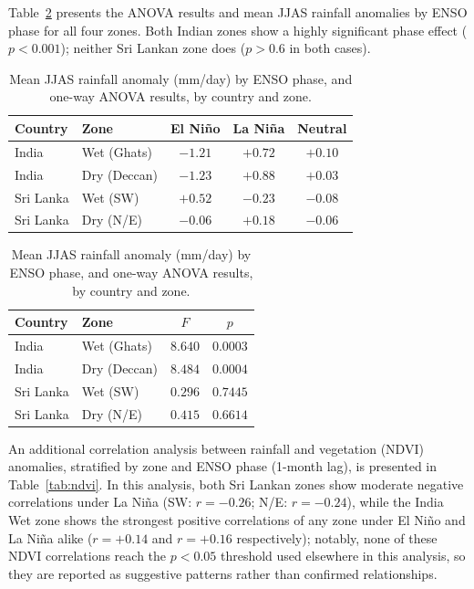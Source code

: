 \documentclass{article}
\begin{document}
Table~\ref{tab:anova} presents the ANOVA results and mean JJAS rainfall anomalies by
ENSO phase for all four zones. Both Indian zones show a highly significant phase effect
($p<0.001$); neither Sri Lankan zone does ($p>0.6$ in both cases).

\begin{table}[h]
\centering
\caption{Mean JJAS rainfall anomaly (mm/day) by ENSO phase, and one-way ANOVA results,
by country and zone.}
\label{tab:anova}
\begin{tabular}{llccc}
\toprule
Country & Zone & El Ni\~{n}o & La Ni\~{n}a & Neutral \\
\midrule
India & Wet (Ghats) & $-1.21$ & $+0.72$ & $+0.10$ \\
India & Dry (Deccan) & $-1.23$ & $+0.88$ & $+0.03$ \\
Sri Lanka & Wet (SW) & $+0.52$ & $-0.23$ & $-0.08$ \\
Sri Lanka & Dry (N/E) & $-0.06$ & $+0.18$ & $-0.06$ \\
\bottomrule
\end{tabular}
\vspace{0.3em}

\begin{tabular}{llcc}
\toprule
Country & Zone & $F$ & $p$ \\
\midrule
India & Wet (Ghats) & $8.640$ & $0.0003$ \\
India & Dry (Deccan) & $8.484$ & $0.0004$ \\
Sri Lanka & Wet (SW) & $0.296$ & $0.7445$ \\
Sri Lanka & Dry (N/E) & $0.415$ & $0.6614$ \\
\bottomrule
\end{tabular}
\end{table}

An additional correlation analysis between rainfall and vegetation
(NDVI)~\cite{vermote2019ndvi} anomalies, stratified by zone and ENSO phase (1-month
lag), is presented in Table~\ref{tab:ndvi}. In
this analysis, both Sri Lankan zones show moderate negative correlations under La
Ni\~{n}a (SW: $r=-0.26$; N/E: $r=-0.24$), while the India Wet zone shows the strongest
positive correlations of any zone under El Ni\~{n}o and La Ni\~{n}a alike ($r=+0.14$ and
$r=+0.16$ respectively); notably, none of these NDVI correlations reach the
$p<0.05$ threshold used elsewhere in this analysis, so they are reported as suggestive
patterns rather than confirmed relationships.
\end{document}
